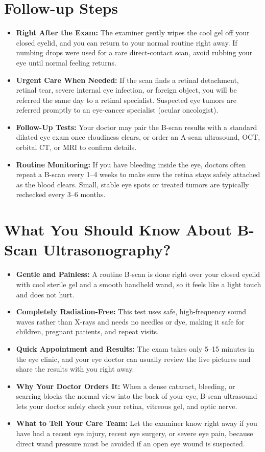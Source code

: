 \section{Follow-up Steps}
\begin{itemize}
    \item \textbf{Right After the Exam:} The examiner gently wipes the cool gel off your closed eyelid, and you can return to your normal routine right away. If numbing drops were used for a rare direct-contact scan, avoid rubbing your eye until normal feeling returns.
    \item \textbf{Urgent Care When Needed:} If the scan finds a retinal detachment, retinal tear, severe internal eye infection, or foreign object, you will be referred the same day to a retinal specialist. Suspected eye tumors are referred promptly to an eye-cancer specialist (ocular oncologist).
    \item \textbf{Follow-Up Tests:} Your doctor may pair the B-scan results with a standard dilated eye exam once cloudiness clears, or order an A-scan ultrasound, OCT, orbital CT, or MRI to confirm details.
    \item \textbf{Routine Monitoring:} If you have bleeding inside the eye, doctors often repeat a B-scan every 1--4 weeks to make sure the retina stays safely attached as the blood clears. Small, stable eye spots or treated tumors are typically rechecked every 3--6 months.
\end{itemize}

\section{What You Should Know About B-Scan Ultrasonography?}
\begin{itemize}
    \item \textbf{Gentle and Painless:} A routine B-scan is done right over your closed eyelid with cool sterile gel and a smooth handheld wand, so it feels like a light touch and does not hurt.
    \item \textbf{Completely Radiation-Free:} This test uses safe, high-frequency sound waves rather than X-rays and needs no needles or dye, making it safe for children, pregnant patients, and repeat visits.
    \item \textbf{Quick Appointment and Results:} The exam takes only 5--15 minutes in the eye clinic, and your eye doctor can usually review the live pictures and share the results with you right away.
    \item \textbf{Why Your Doctor Orders It:} When a dense cataract, bleeding, or scarring blocks the normal view into the back of your eye, B-scan ultrasound lets your doctor safely check your retina, vitreous gel, and optic nerve.
    \item \textbf{What to Tell Your Care Team:} Let the examiner know right away if you have had a recent eye injury, recent eye surgery, or severe eye pain, because direct wand pressure must be avoided if an open eye wound is suspected.
\end{itemize}

